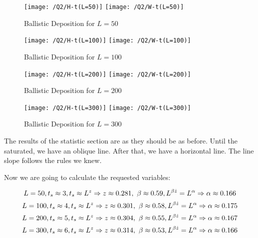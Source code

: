 \documentclass{article}
\begin{document}
    \begin{figure}[!htb]
        \centering
        \texttt{[image: /Q2/H-t(L=50)]}
        \label{fig:2.2}
        \texttt{[image: /Q2/W-t(L=50)]}
        \label{fig:2.3}
        \caption{Ballistic Deposition for $L=50$}
    \end{figure}
    \begin{figure}[!htb]
        \centering
        \texttt{[image: /Q2/H-t(L=100)]}
        \label{fig:2.4}
        \texttt{[image: /Q2/W-t(L=100)]}
        \label{fig:2.5}
        \caption{Ballistic Deposition for $L=100$}
    \end{figure}
    \begin{figure}[!htb]
        \centering
        \texttt{[image: /Q2/H-t(L=200)]}
        \label{fig:2.6}
        \texttt{[image: /Q2/W-t(L=200)]}
        \label{fig:2.7}
        \caption{Ballistic Deposition for $L=200$}
    \end{figure}
    \begin{figure}[!htb]
        \centering
        \texttt{[image: /Q2/H-t(L=300)]}
        \label{fig:2.8}
        \texttt{[image: /Q2/W-t(L=300)]}
        \label{fig:2.9}
        \caption{Ballistic Deposition for $L=300$}
    \end{figure}

    \pagebreak

    The results of the statistic section are as they should be as before.
    Until the saturated, we have an oblique line.
    After that, we have a horizontal line.
    The line slope follows the rules we knew.

    Now we are going to calculate the requested variables:

    \begin{equation}
        \centering
        L = 50, t_{s} \approx 3, t_{s} \approx L^z \Rightarrow z \approx 0.281,\
        \beta \approx 0.59, L^{\beta \dot z} = L^{\alpha} \Rightarrow \alpha \approx 0.166
    \end{equation}
    \begin{equation}
        \centering
        L = 100, t_{s} \approx 4, t_{s} \approx L^z \Rightarrow z \approx 0.301,\
        \beta \approx 0.58, L^{\beta \dot z} = L^{\alpha} \Rightarrow \alpha \approx 0.175
    \end{equation}
    \begin{equation}
        \centering
        L = 200, t_{s} \approx 5, t_{s} \approx L^z \Rightarrow z \approx 0.304,\
        \beta \approx 0.55, L^{\beta \dot z} = L^{\alpha} \Rightarrow \alpha \approx 0.167
    \end{equation}
    \begin{equation}
        \centering
        L = 300, t_{s} \approx 6, t_{s} \approx L^z \Rightarrow z \approx 0.314,\
        \beta \approx 0.53, L^{\beta \dot z} = L^{\alpha} \Rightarrow \alpha \approx 0.166
    \end{equation}
\end{document}

